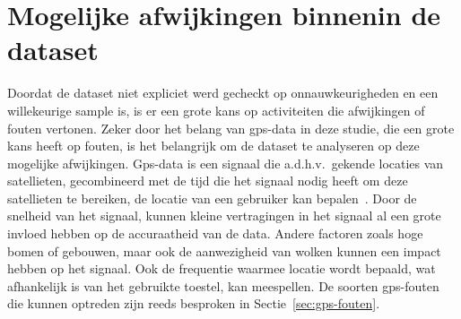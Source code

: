 \section{Mogelijke afwijkingen binnenin de dataset}
Doordat de dataset niet expliciet werd gecheckt op onnauwkeurigheden en een
willekeurige sample is, is er een grote kans op activiteiten die afwijkingen of
fouten vertonen. Zeker door het belang van \ac{gps}-data in deze studie, die
een grote kans heeft op fouten, is het belangrijk om de dataset te analyseren
op deze mogelijke afwijkingen. Gps-data is een signaal die a.d.h.v.\ gekende
locaties van satellieten, gecombineerd met de tijd die het signaal nodig heeft
om deze satellieten te bereiken, de locatie van een gebruiker kan
bepalen~\cite{BadGPSDa19:online}. Door de snelheid van het signaal, kunnen
kleine vertragingen in het signaal al een grote invloed hebben op de
accuraatheid van de data. Andere factoren zoals hoge bomen of gebouwen, maar
ook de aanwezigheid van wolken kunnen een impact hebben op het signaal. Ook de
frequentie waarmee locatie wordt bepaald, wat afhankelijk is van het gebruikte
toestel, kan meespellen. De soorten \ac{gps}-fouten die kunnen optreden zijn
reeds besproken in Sectie~\ref{sec:gps-fouten}.

